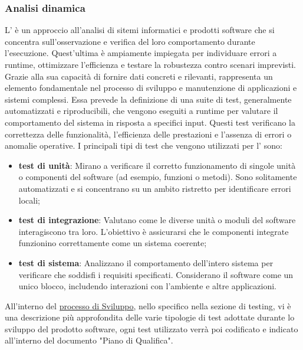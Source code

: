 \subsubsection{Analisi dinamica}
L' è un approccio all'analisi di sitemi informatici e prodotti software che si concentra sull'osservazione e verifica
del loro comportamento durante l'esecuzione.
Quest'ultima è ampiamente impiegata per individuare errori a runtime, ottimizzare l'efficienza e testare la robustezza contro scenari imprevisti.
Grazie alla sua capacità di fornire dati concreti e rilevanti, rappresenta un elemento fondamentale nel processo di sviluppo e manutenzione di applicazioni e sistemi complessi.
Essa prevede la definizione di una suite di test, generalmente automatizzati e riproducibili, che vengono eseguiti a runtime per valutare il comportamento del sistema in risposta a specifici input. 
Questi test verificano la correttezza delle funzionalità, l'efficienza delle prestazioni e l'assenza di errori o anomalie operative.
I principali tipi di test che vengono utilizzati per l' sono: 
\begin{itemize}
    \item \textbf{test di unità}: Mirano a verificare il corretto funzionamento di singole unità o componenti del software (ad esempio, funzioni o metodi). 
    Sono solitamente automatizzati e si concentrano su un ambito ristretto per identificare errori locali;
    \item \textbf{test di integrazione}: Valutano come le diverse unità o moduli del software interagiscono tra loro. 
    L'obiettivo è assicurarsi che le componenti integrate funzionino correttamente come un sistema coerente;
    \item \textbf{test di sistema}: Analizzano il comportamento dell'intero sistema per verificare che soddisfi i requisiti specificati. 
    Considerano il software come un unico blocco, includendo interazioni con l'ambiente e altre applicazioni.
\end{itemize}
All'interno del \hyperref[subsection:processo_sviluppo]{processo di Sviluppo}, nello specifico nella sezione di testing, vi è una descrizione 
più approfondita delle varie tipologie di test adottate durante lo sviluppo del prodotto software, ogni test utilizzato verrà poi 
codificato e indicato all'interno del documento "Piano di Qualifica".

